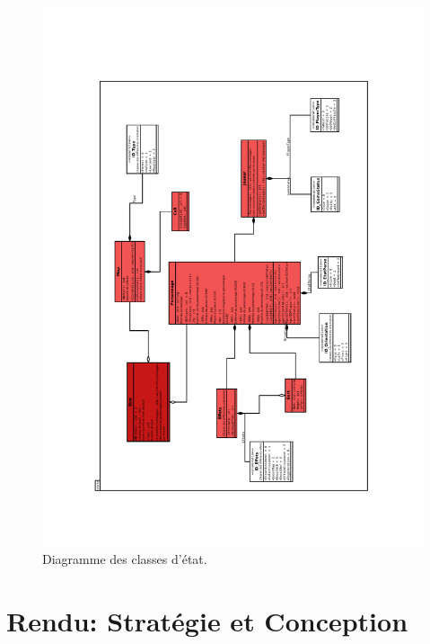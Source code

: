 \documentclass[a4paper,12pt]{article}
\begin{document}
\begin{landscape}
\begin{figure}[p]
\includegraphics[width=0.8\paperwidth,angle=270]{StateUML_1.pdf}
\caption{\label{uml:state}Diagramme des classes d'état.} 
\end{figure}
\end{landscape}

\clearpage
\section{Rendu: Stratégie et Conception}
\end{document}
